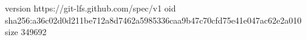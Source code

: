 version https://git-lfs.github.com/spec/v1
oid sha256:a36c02d0d211be712a8d7462a5985336caa9b47c70cfd75e41e047ac62e2a010
size 349692

